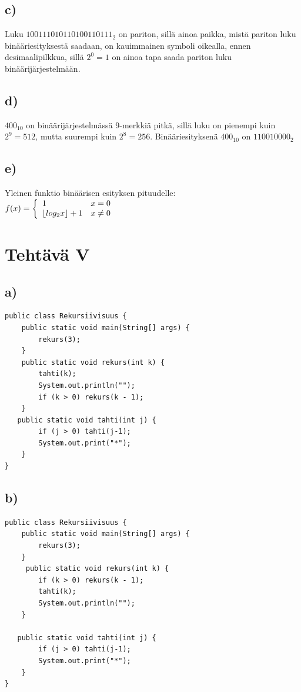 \documentclass[a4paper, 12pt]{article}
\begin{document}
\subsection*{c)}
Luku $100111010110100110111_2$ on pariton, sillä ainoa paikka, mistä pariton luku binääriesityksestä saadaan, on kauimmainen symboli oikealla, ennen desimaalipilkkua, sillä $2^0=1$ on ainoa tapa saada pariton luku binäärijärjestelmään.
\subsection*{d)}
$400_{10}$ on binäärijärjestelmässä $9$-merkkiä pitkä, sillä luku on pienempi kuin $2^9=512$, mutta suurempi kuin $2^8=256$. Binääriesityksenä $400_{10}$ on $110010000_2$
\subsection*{e)}
Yleinen funktio binäärisen esityksen pituudelle: \\
$f(x) = \left\{
   \begin{array}{l l}
    1 & x = 0 \\
    \lfloor log_2 x\rfloor +1 & x \neq 0
  \end{array} \right.
$
\section*{Tehtävä V}
\subsection*{a)}
\begin{lstlisting}
public class Rekursiivisuus {
    public static void main(String[] args) {
        rekurs(3);
    }
    public static void rekurs(int k) {
        tahti(k);
        System.out.println("");
        if (k > 0) rekurs(k - 1);
    }
   public static void tahti(int j) {
        if (j > 0) tahti(j-1);   
        System.out.print("*");
    }
}
\end{lstlisting}
\subsection*{b)}
\begin{lstlisting}
public class Rekursiivisuus {
    public static void main(String[] args) {
        rekurs(3);
    }
     public static void rekurs(int k) {
        if (k > 0) rekurs(k - 1);
        tahti(k);
        System.out.println("");
    }

   public static void tahti(int j) {
        if (j > 0) tahti(j-1);   
        System.out.print("*");
    }
}
\end{lstlisting}
\newpage
\end{document}
